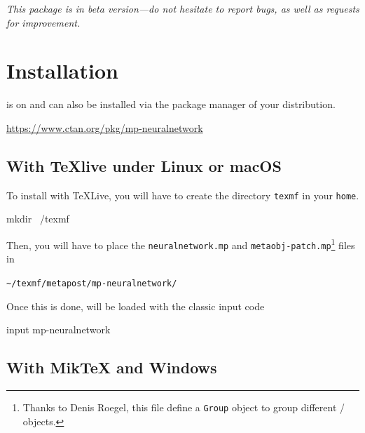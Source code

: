 \documentclass[english]{ltxdoc}
\begin{document}
\bigskip

\begin{tcolorbox}[ arc=0pt,outer arc=0pt,
  colback=darkred!3,
  colframe=darkred,
  breakable,
  boxsep=0pt,left=5pt,right=5pt,top=5pt,bottom=5pt, bottomtitle =
  3pt, toptitle=3pt,
  boxrule=0pt,bottomrule=0.5pt,toprule=0.5pt, toprule at break =
  0pt, bottomrule at break = 0pt,]
  \itshape
  This package is in beta version---do not hesitate to report bugs, as well as requests for improvement.
\end{tcolorbox}

\section{Installation}

\mpneural is on \ctan{} and can also be installed via the package manager of your
distribution.

\begin{center}
  \url{https://www.ctan.org/pkg/mp-neuralnetwork}
\end{center}


\subsection{With \TeX live under Linux or macOS}

To install \mpneural with \TeX Live, you will have to create the directory
\lstinline+texmf+  in your \lstinline+home+. 

\begin{commandshell}
mkdir ~/texmf
\end{commandshell}

Then, you will have to place the \lstinline+neuralnetwork.mp+ and
\lstinline+metaobj-patch.mp+\footnote{Thanks to Denis Roegel, this file define a
\texttt{Group} object to group different \MO/ objects.
} files in 
\begin{center}
  \lstinline+~/texmf/metapost/mp-neuralnetwork/+
\end{center}


Once this is done, \mpneural will be loaded with the classic \MP{}
input code
\begin{mpcode}
input mp-neuralnetwork
\end{mpcode}

\subsection{With Mik\TeX{} and Windows}
\end{document}
